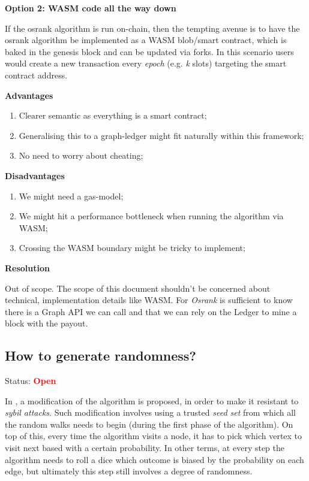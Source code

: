 \documentclass{article}
\begin{document}
\textbf{Option 2: WASM code all the way down}

If the osrank algorithm is run on-chain, then the tempting avenue is to have
the osrank algorithm be implemented as a WASM blob/smart contract, which is baked in the genesis block and can be updated via forks. In this scenario
users would create a new transaction every \textit{epoch} (e.g. \textit{k} slots) targeting the smart contract address.

\textbf{Advantages}

\begin{enumerate}
\item Clearer semantic as everything is a smart contract;
\item Generalising this to a graph-ledger might fit naturally within
      this framework;
\item No need to worry about cheating;
\end{enumerate}

\textbf{Disadvantages}

\begin{enumerate}
    \item We might need a gas-model;
    \item We might hit a performance bottleneck when running the algorithm
          via WASM;
    \item Crossing the WASM boundary might be tricky to implement;
\end{enumerate}

\textbf{Resolution}

Out of scope. The scope of this document shouldn't be concerned about technical,
implementation details like WASM. For \textit{Osrank} is sufficient to
know there is a Graph API we can call and that we can rely on the Ledger
to mine a block with the payout.

\subsection{How to generate randomness?}

Status: \textcolor{red}{\textbf{Open}}

In \citep{opensourcecoin2019}, a modification of the algorithm is proposed,
in order to make it resistant to \textit{sybil attacks}. Such modification
involves using a trusted \textit{seed set} from which all the random walks
needs to begin (during the first phase of the algorithm). On top of this,
every time the algorithm visits a node, it has to pick which vertex to
visit next based with a certain probability. In other terms, at every step the
algorithm needs to roll a dice which outcome is biased by the probability on
each edge, but ultimately this step still involves a degree of randomness.
\end{document}
